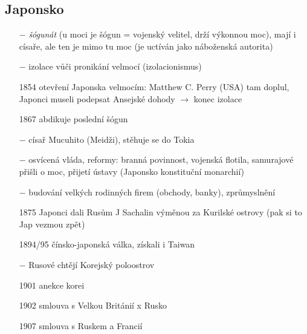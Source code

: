 \documentclass{article}
\begin{document}
\subsection*{Japonsko}
\begin{itemize}
    \vspace{-0.5em}
    \setlength\itemsep{0.15em}
    \item[$-$] \textit{šógunát}  (u moci je šógun = vojenský velitel, drží výkonnou moc), mají i císaře, ale ten je mimo tu moc (je uctíván jako náboženská autorita)
    \item[$-$] izolace vůči pronikání velmocí (izolacionismus)
    \item[1854] otevření Japonska velmocím: Matthew C. Perry (USA) tam doplul, Japonci museli podepsat Ansejské dohody $\rightarrow$  konec izolace
    \item[1867]  abdikuje poslední šógun
    \item[$-$] císař Mucuhito (Meidži), stěhuje se do Tokia
    \item[$-$] osvícená vláda, reformy: branná povinnost, vojenská flotila, samurajové přišli o moc, přijetí ústavy (Japonsko konstituční monarchií)
    \item[$-$] budování velkých rodinných firem (obchody, banky), zprůmyslnění
    \item[1875]  Japonci dali Rusům J Sachalin výměnou za Kurilské ostrovy (pak si to Jap vezmou zpět)
    \item[1894/95]  čínsko-japonská válka, získali i Taiwan
    \item[$-$] Rusové chtějí Korejský poloostrov
    \item[1901]  anekce korei
    \item[1902]  smlouva s Velkou Británií x Rusko
    \item[1907]  smlouva s Ruskem a Francií

\end{itemize}
\end{document}
